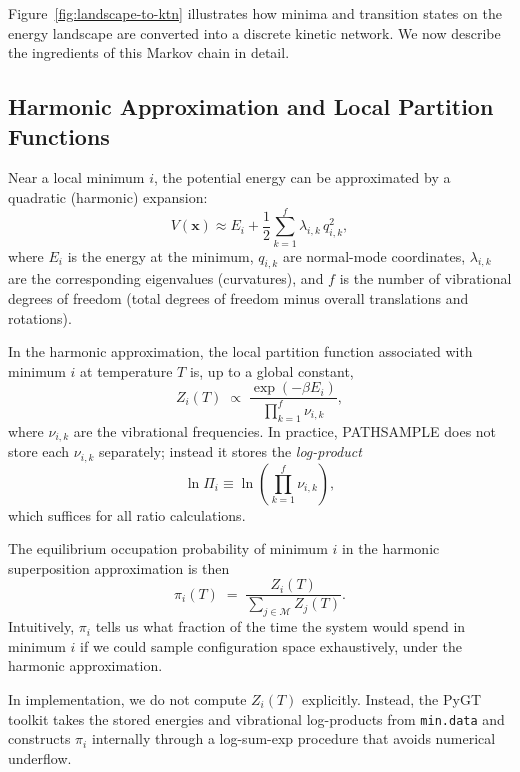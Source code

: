 Figure~\ref{fig:landscape-to-ktn} illustrates how minima and transition states on
the energy landscape are converted into a discrete kinetic network. We now describe
the ingredients of this Markov chain in detail.

\subsection{Harmonic Approximation and Local Partition Functions}\label{subsec:harmonic}

Near a local minimum $i$, the potential energy can be approximated by a
quadratic (harmonic) expansion:
\begin{equation}\label{eq:harmonic-expansion}
  V(\mathbf{x}) \approx E_i + \frac{1}{2} \sum_{k=1}^{f}
  \lambda_{i,k}\, q_{i,k}^2,
\end{equation}
where $E_i$ is the energy at the minimum, $q_{i,k}$ are normal-mode coordinates,
$\lambda_{i,k}$ are the corresponding eigenvalues (curvatures), and $f$ is the number
of vibrational degrees of freedom (total degrees of freedom minus overall translations
and rotations).

In the harmonic approximation, the local partition function associated
with minimum $i$ at temperature $T$ is, up to a global constant,
\begin{equation}\label{eq:Zi}
  Z_i(T) \;\propto\;
  \frac{\exp(-\beta E_i)}{\prod_{k=1}^{f} \nu_{i,k}},
\end{equation}
where $\nu_{i,k}$ are the vibrational frequencies. In practice,
PATHSAMPLE does not store each $\nu_{i,k}$ separately; instead it stores
the \emph{log-product}
\begin{equation}
  \ln \Pi_i \equiv \ln \left( \prod_{k=1}^{f} \nu_{i,k} \right),
\end{equation}
which suffices for all ratio calculations.

The equilibrium occupation probability of minimum $i$ in the harmonic
superposition approximation is then
\begin{equation}\label{eq:pi-eq}
  \pi_i(T) \;=\;
  \frac{Z_i(T)}{\displaystyle \sum_{j\in\mathcal{M}} Z_j(T)}.
\end{equation}
Intuitively, $\pi_i$ tells us what fraction of the time the system
would spend in minimum $i$ if we could sample configuration space
exhaustively, under the harmonic approximation.

In implementation, we do not compute $Z_i(T)$ explicitly. Instead, the
PyGT toolkit takes the stored energies and vibrational log-products
from \texttt{min.data} and constructs $\pi_i$ internally through a
log-sum-exp procedure that avoids numerical underflow.


